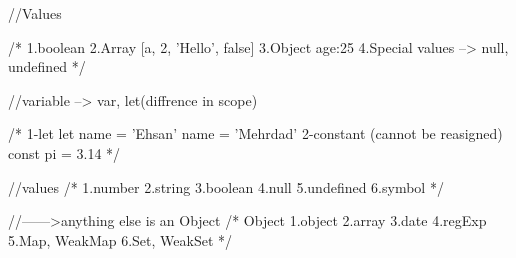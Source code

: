 //Values

/*
1.boolean
2.Array [a, 2, 'Hello', false]
3.Object {age:25}
4.Special values --> null, undefined
*/

//variable --> var, let(diffrence in scope)

/*
1-let
let name = 'Ehsan'
name = 'Mehrdad'
2-constant (cannot be reasigned)
const pi = 3.14
*/

//values
/*
1.number
2.string
3.boolean
4.null
5.undefined
6.symbol
*/

//------>anything else is an Object
/*
Object
1.object
2.array
3.date
4.regExp
5.Map, WeakMap
6.Set, WeakSet
*/
